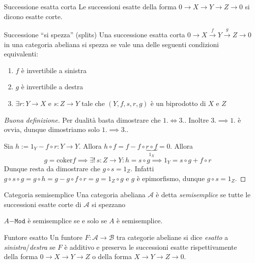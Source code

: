 \begin{definition}{Successione esatta corta}
    Le successioni esatte della forma \( 0 \to X \to Y \to Z \to 0\) si dicono
    esatte corte.
\end{definition}
\begin{definition}{Successione ``si spezza'' (splits)}
    Una successione esatta corta \(0 \to X \overset{f}{\to } Y \overset{g}{\to } Z \to 0\) in una
    categoria abeliana si spezza se vale una delle seguenti condizioni
    equivalenti:
\begin{enumerate}[label = \arabic*.]
    \item \(f\) è invertibile a sinistra 
    \item \(g\) è invertibile a destra
    \item \(\exists r : Y \to X\) e \(s : Z \to Y\) tale che \({(Y, f, s, r, g)}\) è un biprodotto di \(X \) e \(Z\) 
\end{enumerate}
\end{definition}
\begin{proof}[Buona definizione]
    Per dualità basta dimostrare che \(1. \iff 3.\). Inoltre \(
    3. \implies 1.\) è ovvia, dunque dimostriamo solo \(1. \implies 3.\).

    Sia \(h:= 1_Y - f \circ r : Y \to Y\). Allora \(h \circ f = f - f \circ
    \underbrace{r \circ f}_{1_X} = 0\). Allora
    \[g = \mathrm{coker}f \implies \exists !\, s : Z \to Y : h = s \circ g
    \implies 1_Y = s \circ g + f \circ r \]
    Dunque resta da dimostrare che \(g \circ s = 1_Z\). Infatti \(g \circ s \circ g = g \circ h = g - g \circ f \circ r = g = 1_Z \circ g\) e \(g\) è epimorfismo, dunque \(g \circ s = 1_Z\).
\end{proof}

\begin{definition}{Categoria semisemplice}
    Una categoria abeliana \(\mathcal{A}\) è detta \emph{semisemplice} se tutte le
    successioni esatte corte di \(\mathcal{A}\) si spezzano 
\end{definition}

\begin{example}{}
    \(A\mathtt{-Mod}\) è semisemplice se e solo se \(A\) è semisemplice.
\end{example}

\begin{definition}{Funtore esatto}
    Un funtore \(F : \mathcal{A} \to \mathcal{B}\) tra categorie abeliane si
    dice \emph{esatto} a \emph{sinistra}/\emph{destra} se \(F\) è additivo e
    preserva le successioni esatte rispettivamente della forma \(0 \to X \to Y \to Z\) o della forma 
    \(X \to Y \to Z \to 0\).
\end{definition}

